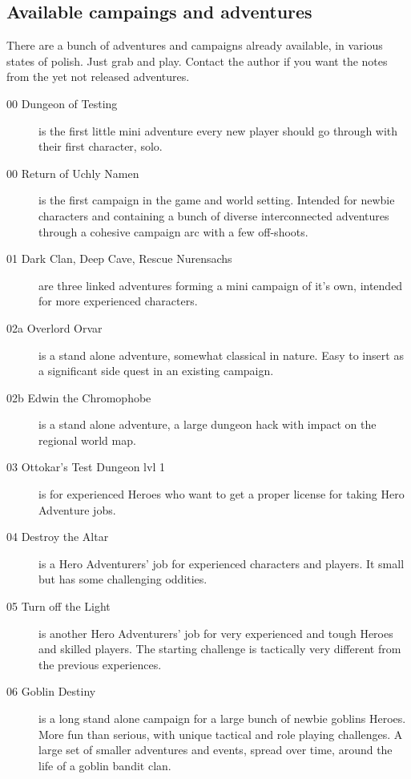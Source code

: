 \subsection*{Available campaings and adventures}
There are a bunch of adventures and campaigns already available, in various states of polish. Just grab and play. Contact the author if you want the notes from the yet not released adventures.

\begin{description}
    \item[00 Dungeon of Testing] is the first little mini adventure every new player should go through with their first character, solo.
    \item[00 Return of Uchly Namen] is the first campaign in the game and world setting. Intended for newbie characters and containing a bunch of diverse interconnected adventures through a cohesive campaign arc with a few off-shoots.
    \item[01 Dark Clan, Deep Cave, Rescue Nurensachs] are three linked adventures forming a mini campaign of it's own, intended for more experienced characters.
    \item[02a Overlord Orvar] is a stand alone adventure, somewhat classical in nature. Easy to insert as a significant side quest in an existing campaign.
    \item[02b Edwin the Chromophobe] is a stand alone adventure, a large dungeon hack with impact on the regional world map. 
    \item[03 Ottokar's Test Dungeon lvl 1] is for experienced Heroes who want to get a proper license for taking Hero Adventure jobs.
    \item[04 Destroy the Altar] is a Hero Adventurers' job for experienced characters and players. It small but has some challenging oddities.
    \item[05 Turn off the Light] is another Hero Adventurers' job for very experienced and tough Heroes and skilled players. The starting challenge is tactically very different from the previous experiences.
    \item[06 Goblin Destiny] is a long stand alone campaign for a large bunch of newbie goblins Heroes. More fun than serious, with unique tactical and role playing challenges. A large set of smaller adventures and events, spread over time, around the life of a goblin bandit clan.
\end{description}


